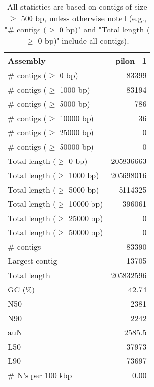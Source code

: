 \documentclass[12pt,a4paper]{article}
\begin{document}
\begin{table}[ht]
\begin{center}
\caption{All statistics are based on contigs of size $\geq$ 500 bp, unless otherwise noted (e.g., "\# contigs ($\geq$ 0 bp)" and "Total length ($\geq$ 0 bp)" include all contigs).}
\begin{tabular}{|l*{1}{|r}|}
\hline
Assembly & pilon\_1 \\ \hline
\# contigs ($\geq$ 0 bp) & 83399 \\ \hline
\# contigs ($\geq$ 1000 bp) & 83194 \\ \hline
\# contigs ($\geq$ 5000 bp) & 786 \\ \hline
\# contigs ($\geq$ 10000 bp) & 36 \\ \hline
\# contigs ($\geq$ 25000 bp) & 0 \\ \hline
\# contigs ($\geq$ 50000 bp) & 0 \\ \hline
Total length ($\geq$ 0 bp) & 205836663 \\ \hline
Total length ($\geq$ 1000 bp) & 205698016 \\ \hline
Total length ($\geq$ 5000 bp) & 5114325 \\ \hline
Total length ($\geq$ 10000 bp) & 396061 \\ \hline
Total length ($\geq$ 25000 bp) & 0 \\ \hline
Total length ($\geq$ 50000 bp) & 0 \\ \hline
\# contigs & 83390 \\ \hline
Largest contig & 13705 \\ \hline
Total length & 205832596 \\ \hline
GC (\%) & 42.74 \\ \hline
N50 & 2381 \\ \hline
N90 & 2242 \\ \hline
auN & 2585.5 \\ \hline
L50 & 37973 \\ \hline
L90 & 73697 \\ \hline
\# N's per 100 kbp & 0.00 \\ \hline
\end{tabular}
\end{center}
\end{table}
\end{document}
